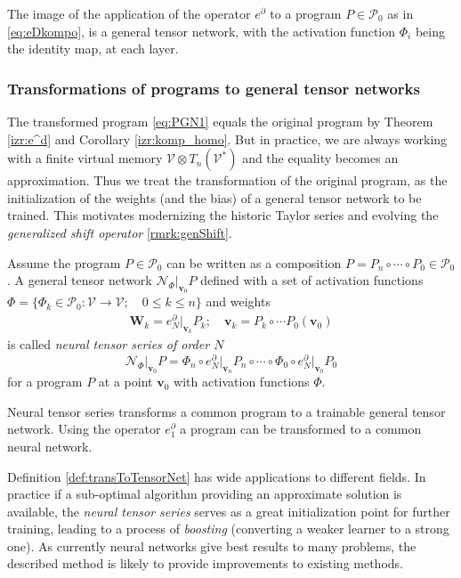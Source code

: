 \documentclass[smallcondensed]{svjour3}
\newcommand{\bfW}{\mathbf{W}}
\newcommand{\VV}{\mathcal{V}}
\newcommand{\vv}{\mathbf{v}}
\newcommand{\dP}{\mathcal{P}}
\newcommand{\D}{\partial}
\begin{document}
\begin{proposition}
The image of the application of the operator $e^\D$ to a program $P\in\dP_0$ as in \eqref{eq:eDkompo}, is a general tensor network, with the activation function $\Phi_i$ being the identity map, at each layer.
\end{proposition}

\subsubsection{Transformations of programs to general tensor networks}\label{sec:transToNet}

The transformed program \eqref{eq:PGN1} equals the original program by Theorem \ref{izr:e^d} and Corollary \ref{izr:komp_homo}. But in practice, we are always working with a finite virtual memory $\VV\otimes T_n(\VV^*)$ and the equality becomes an approximation. Thus we treat the transformation of the original program, as the initialization of the weights (and the bias) of a general tensor network to be trained.  This motivates modernizing the historic Taylor series and evolving the \emph{generalized shift operator} \eqref{rmrk:genShift}.
\begin{definition}\label{def:transToTensorNet}
 Assume the program $P\in\dP_0$ can be written as a
 composition $P=P_n\circ\cdots\circ P_0\in\dP_0$. A general tensor network
 $\mathcal{N}_\Phi\vert_{\mathbf{v}_0}P$ defined with a set of activation
 functions $\Phi=\{\Phi_k\in\dP_0:\VV\to\VV;\quad 0\le k\le n\}$ and 
 weights
\begin{eqnarray}
\bfW_k = e^\D_N\vert_{\mathbf{v}_k}P_k;\quad \vv_k=P_k\circ \cdots P_0(\vv_0)
\end{eqnarray}
is called \emph{neural tensor series of order $N$} 
\begin{equation}
\mathcal{N}_\Phi\vert_{\mathbf{v}_0}P=\Phi_n\circ e^\D_N\vert_{\mathbf{v}_n}P_n\circ\cdots\circ\Phi_0\circ e^\D_N\vert_{\mathbf{v}_0}P_0
\end{equation}
for a program $P$ at a point
$\vv_0$ with activation functions $\Phi$. 
\end{definition}


\begin{remark}
Neural tensor series transforms a common program to a trainable general tensor network.
Using the operator $e^ \D_1$ a program can be transformed to a common neural network.
\end{remark}
Definition \ref{def:transToTensorNet} has wide applications to different fields.
In practice if a sub-optimal algorithm providing an approximate
solution is available, the \emph{neural tensor series} serves as a great
initialization point for further training, leading to a process of
\emph{boosting} \cite{boosting}(converting a weaker learner to a strong one).
As currently neural networks give best results to many problems, the described
method is likely to provide improvements to existing methods.
\end{document}
